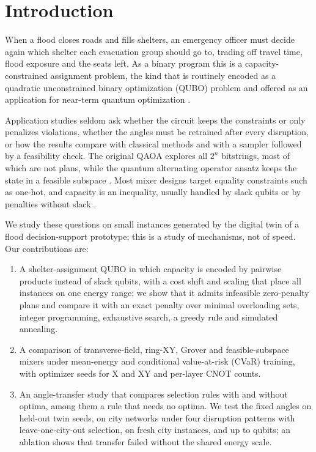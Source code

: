 \documentclass[conference]{IEEEtran}
\begin{document}
\section{Introduction}
When a flood closes roads and fills shelters, an emergency officer must decide again which shelter each evacuation group should go to, trading off travel time, flood exposure and the seats left. As a binary program this is a capacity-constrained assignment problem, the kind that is routinely encoded as a quadratic unconstrained binary optimization (QUBO) problem \cite{Lucas2014,Glover2019} and offered as an application for near-term quantum optimization \cite{Cadelina2024,Abbas2024}.

Application studies \cite{Cadelina2024,Abbas2024} seldom ask whether the circuit keeps the constraints or only penalizes violations, whether the angles must be retrained after every disruption, or how the results compare with classical methods and with a sampler followed by a feasibility check. The original QAOA \cite{Farhi2014} explores all $2^n$ bitstrings, most of which are not plans, while the quantum alternating operator ansatz \cite{Hadfield2019} keeps the state in a feasible subspace \cite{WangZ2020,Fuchs2022,Bartschi2020}. Most mixer designs target equality constraints such as one-hot, and capacity is an inequality, usually handled by slack qubits or by penalties without slack \cite{Montanez2024}.

We study these questions on small instances generated by the digital twin of a flood decision-support prototype; this is a study of mechanisms, not of speed. Our contributions are:
\begin{enumerate}
\item A shelter-assignment QUBO in which capacity is encoded by pairwise products instead of slack qubits, with a cost shift and scaling that place all instances on one energy range; we show that it admits infeasible zero-penalty plans and compare it with an exact penalty over minimal overloading sets, integer programming, exhaustive search, a greedy rule and simulated annealing.
\item A comparison of transverse-field, ring-XY, Grover and feasible-subspace mixers under mean-energy and conditional value-at-risk (CVaR) training, with \NSeeds{} optimizer seeds for X and XY and per-layer CNOT counts.
\item An angle-transfer study that compares selection rules with and without optima, among them a rule that needs no optima. We test the fixed angles on held-out twin seeds, on city networks under four disruption patterns with leave-one-city-out selection, on fresh city instances, and up to \ScQubitsMax{} qubits; an ablation shows that transfer failed without the shared energy scale.
\end{enumerate}
\end{document}
